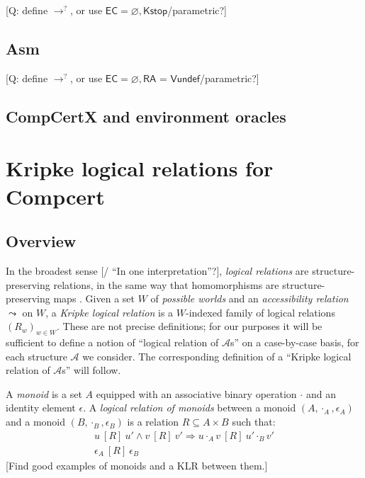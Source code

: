 \documentclass[acmsmall,anonymous]{acmart}
\newcommand{\ifr}[1]{\ [{#1}]\ }
\begin{document}
[Q: define $\rightarrow^?$,
or use $\textsf{EC} = \varnothing, \textsf{Kstop}$/parametric?]


\subsection{Asm} %

[Q: define $\rightarrow^?$,
or use $\textsf{EC} = \varnothing, \textsf{RA = Vundef}$/parametric?]


\subsection{CompCertX and environment oracles}


\newpage
\section{Kripke logical relations for Compcert} %


\subsection{Overview} %

In the broadest sense [/ ``In one interpretation''?],
\emph{logical relations} are structure-preserving relations,
in the same way that homomorphisms are structure-preserving maps
\citep{lrp}.
Given a set $W$ of \emph{possible worlds}
and an \emph{accessibility relation} $\leadsto$ on $W$,
a \emph{Kripke logical relation} is
a $W$-indexed family of logical relations $(R_w)_{w \in W}$.
These are not precise definitions;
for our purposes it will be sufficient
to define a notion of ``logical relation of $\mathcal{A}$s''
on a case-by-case basis,
for each structure $\mathcal{A}$ we consider.
The corresponding definition of a
``Kripke logical relation of $\mathcal{A}$s''
will follow.

\begin{example}
A \emph{monoid} is a set $A$ equipped with
an associative binary operation $\cdot$ and
an identity element $\epsilon$.
A \emph{logical relation of monoids} between
a monoid $(A, \cdot_A, \epsilon_A)$ and
a monoid $(B, \cdot_B, \epsilon_B)$
is a relation $R \subseteq A \times B$
such that:
\begin{gather*}
u \ifr{R} u' \wedge v \ifr{R} v' \Rightarrow u \cdot_A v \ifr{R} u' \cdot_B v' \\
\epsilon_A \ifr{R} \epsilon_B
\end{gather*}
[Find good examples of monoids and a KLR between them.]
\end{example}
\end{document}
